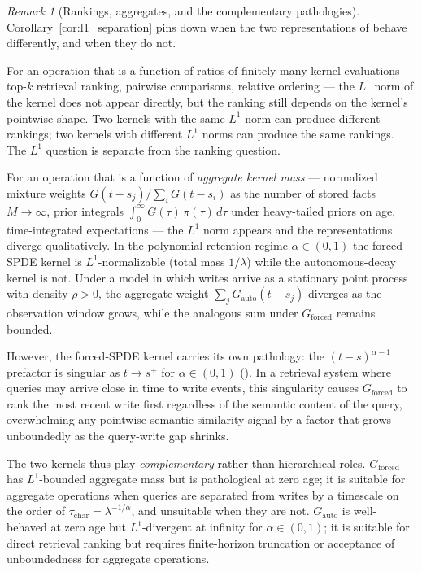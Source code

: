 \documentclass[11pt]{article}
\theoremstyle{definition}
\theoremstyle{remark}
\newtheorem{remark}[theorem]{Remark}
\begin{document}
\begin{remark}[Rankings, aggregates, and the
complementary pathologies]
\label{rem:l1_consequence}
Corollary~\ref{cor:l1_separation} pins down when the
two representations of 
behave differently, and when they do not.

For an operation that is a function of ratios of
finitely many kernel evaluations --- top-$k$
retrieval ranking, pairwise comparisons, relative
ordering --- the $L^1$ norm of the kernel does not
appear directly, but the ranking still depends on
the kernel's pointwise shape.  Two kernels with
the same $L^1$ norm can produce different rankings;
two kernels with different $L^1$ norms can produce
the same rankings.  The $L^1$ question is separate
from the ranking question.

For an operation that is a function of
\emph{aggregate kernel mass} --- normalized mixture
weights $G(t - s_j)/\sum_i G(t - s_i)$ as the number
of stored facts $M \to \infty$, prior integrals
$\int_0^\infty G(\tau)\,\pi(\tau)\,d\tau$ under
heavy-tailed priors on age, time-integrated
expectations --- the $L^1$ norm appears and the
representations diverge qualitatively.  In the
polynomial-retention regime $\alpha \in (0, 1)$ the
forced-SPDE kernel is $L^1$-normalizable (total
mass $1/\lambda$) while the autonomous-decay kernel
is not.  Under a model in which writes arrive as a
stationary point process with density $\rho > 0$,
the aggregate weight
$\sum_j G_{\mathrm{auto}}(t - s_j)$ diverges as the
observation window grows, while the analogous sum
under $G_{\mathrm{forced}}$ remains bounded.

However, the forced-SPDE kernel carries its own
pathology: the $(t - s)^{\alpha-1}$ prefactor is
singular as $t \to s^+$ for $\alpha \in (0, 1)$
().  In a retrieval
system where queries may arrive close in time to
write events, this singularity causes
$G_{\mathrm{forced}}$ to rank the most recent write
first regardless of the semantic content of the
query, overwhelming any pointwise semantic
similarity signal by a factor that grows
unboundedly as the query-write gap shrinks.

The two kernels thus play \emph{complementary}
rather than hierarchical roles.  $G_{\mathrm{forced}}$
has $L^1$-bounded aggregate mass but is
pathological at zero age; it is suitable for
aggregate operations when queries are separated
from writes by a timescale on the order of
$\tau_{\mathrm{char}} = \lambda^{-1/\alpha}$, and
unsuitable when they are not.
$G_{\mathrm{auto}}$ is well-behaved at zero age but
$L^1$-divergent at infinity for $\alpha \in (0, 1)$;
it is suitable for direct retrieval ranking but
requires finite-horizon truncation or acceptance of
unboundedness for aggregate operations.


\end{remark}
\end{document}
